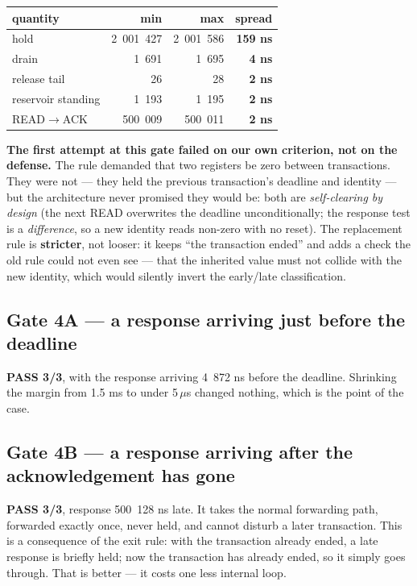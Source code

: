 \documentclass[10pt,a4paper,oneside]{article}
\newcommand{\num}[1]{\mbox{#1}}
\begin{document}
\begin{center}
\begin{tabular}{lrrr}
\toprule
\textbf{quantity} & \textbf{min} & \textbf{max} & \textbf{spread} \\
\midrule
hold                & \num{2 001 427} & \num{2 001 586} & \textbf{\num{159} ns} \\
drain               & \num{1 691}     & \num{1 695}     & \textbf{4 ns} \\
release tail        & 26              & 28              & \textbf{2 ns} \\
reservoir standing  & \num{1 193}     & \num{1 195}     & \textbf{2 ns} \\
READ$\to$ACK        & \num{500 009}   & \num{500 011}   & \textbf{2 ns} \\
\bottomrule
\end{tabular}
\end{center}

\textbf{The first attempt at this gate failed on our own criterion, not on the defense.} The
rule demanded that two registers be zero between transactions. They were not --- they held
the previous transaction's deadline and identity --- but the architecture never promised they
would be: both are \emph{self-clearing by design} (the next READ overwrites the deadline
unconditionally; the response test is a \emph{difference}, so a new identity reads non-zero
with no reset). The replacement rule is \textbf{stricter}, not looser: it keeps ``the
transaction ended'' and adds a check the old rule could not even see --- that the inherited
value must not collide with the new identity, which would silently invert the early/late
classification.

\subsection{Gate 4A --- a response arriving just before the deadline}

\textbf{PASS 3/3}, with the response arriving \num{4 872} ns before the deadline. Shrinking
the margin from 1.5 ms to under 5\,$\mu$s changed nothing, which is the point of the case.

\subsection{Gate 4B --- a response arriving after the acknowledgement has gone}

\textbf{PASS 3/3}, response \num{500 128} ns late. It takes the normal forwarding path,
forwarded exactly once, never held, and cannot disturb a later transaction. This is a
consequence of the exit rule: with the transaction already ended, a late response is
briefly held; now the transaction has already ended, so it simply goes through. That is
better --- it costs one less internal loop.
\end{document}
